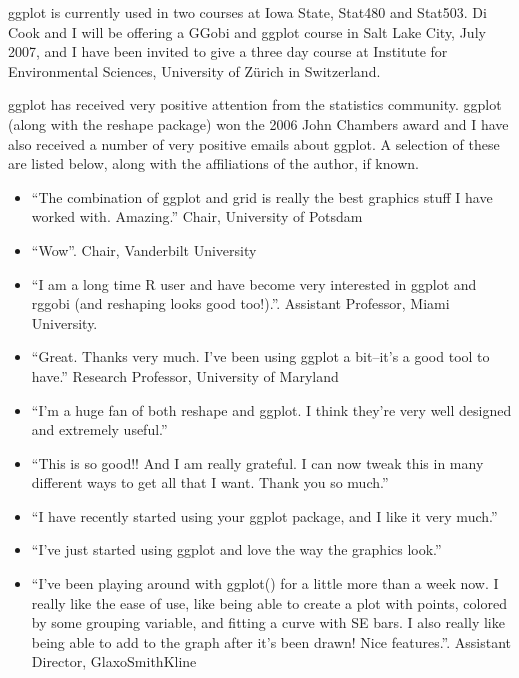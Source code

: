 \documentclass[oneside,letterpaper]{scrartcl}
\begin{document}
ggplot is currently used in two courses  at Iowa State, Stat480 and Stat503.  Di Cook and I will be offering a GGobi and ggplot course in Salt Lake City, July 2007, and I have been invited to give a three day course at Institute for Environmental Sciences, University of Zürich in Switzerland.
 
ggplot has received very positive attention from the statistics community. ggplot (along with the reshape package) won the 2006 John Chambers award and I have also received a number of very positive emails about ggplot.  A selection of these are listed below, along with the affiliations of the author, if known.

\begin{itemize}

  \item ``The combination of ggplot and grid is really the best graphics stuff I have worked with. Amazing.'' Chair, University of Potsdam

  \item ``Wow''.  Chair, Vanderbilt University

  \item ``I am a long time R user and have become very interested in ggplot and rggobi (and reshaping looks good too!).''.  Assistant Professor, Miami University.

  \item ``Great. Thanks very much. I've been using ggplot a bit--it's a good tool to have.'' Research Professor, University of Maryland

  \item ``I'm a huge fan of both reshape and ggplot.  I think they're very well designed and extremely useful.''

  \item ``This is so good!! And I am really grateful. I can now tweak this in many different ways to get all that I want. Thank you so much.''

  \item ``I have recently started using your ggplot package, and I like it very much.''

  \item ``I've just started using ggplot and love the way the graphics look.''

  \item ``I've been playing around with ggplot() for a little more than a week now.  I really like the ease of use, like being able to create a plot with points, colored by some grouping variable, and fitting a curve with SE bars.  I also really like being able to add to the graph after it's been drawn!  Nice features.''.  Assistant Director, GlaxoSmithKline


\end{itemize}
\end{document}
